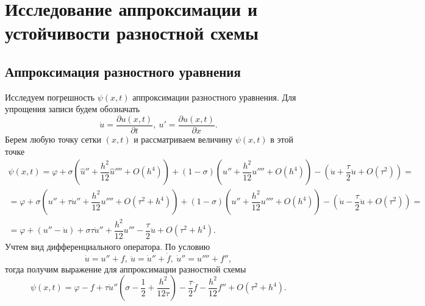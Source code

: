 \documentclass[a4paper, 12pt]{article}
\renewcommand{\d}{\partial}
\begin{document}
    \section*{Исследование аппроксимации и устойчивости разностной схемы}
    \subsection*{Аппроксимация разностного уравнения}
    Исследуем погрешность $\psi(x,t)$ аппроксимации разностного уравнения.
    Для упрощения записи будем обозначать
    $$\dot u = \dfrac{\d u(x,t)}{\d t},\ u' =\dfrac{\d u(x,t)}{\d x}.$$ 
    Берем любую точку сетки $(x,t)$ и рассматриваем величину $\psi(x,t)$ в этой точке
    \begin{multline*}
    	\psi(x,t) = \varphi + \sigma \left(\hat u '' + \dfrac{h^2}{12}\hat u '''' + O(h^4) \right) + (1-\sigma)\left(u'' + \dfrac {h^2}{12} u'''' + O(h^4)\right) - \left(\dot u + \dfrac \tau 2 \ddot u + O(\tau^2) \right)=\\
    	= \varphi + \sigma \left(u'' + \tau \dot u '' + \dfrac {h^2}{12} u'''' + O(\tau^2 + h^4)\right) + (1-\sigma) \left(u'' + \dfrac{h^2}{12} u'''' + O(h^4)\right) - (\dot u - \dfrac \tau 2 \ddot u + O(\tau^2)) = \\=
    	\varphi + (u'' - \dot u) + \sigma \tau \dot u '' + \dfrac {h^2}{12} u''' - \dfrac \tau 2 \ddot u + O(\tau^2 + h^4).
    \end{multline*}
    Учтем вид дифференциального оператора. По условию
    $$\dot u = u'' + f,\ \ddot u = \dot u '' + \dot f,\ \dot u '' = u'''' + f'',$$
    тогда получим выражение для аппроксимации разностной схемы
    $$\psi(x,t) = \varphi - f + \tau \dot u''\left(\sigma - \dfrac 12 + \dfrac {h^2}{12\tau}\right) - \dfrac \tau 2 \dot f - \dfrac{h^2}{12}f'' + O(\tau^2 + h^4).$$
\end{document}
